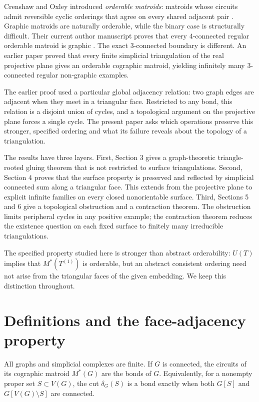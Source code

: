 \documentclass[11pt]{article}
\begin{document}
Crenshaw and Oxley introduced \emph{orderable matroids}: matroids whose circuits
admit reversible cyclic orderings that agree on every shared adjacent pair
\cite{crenshaw-oxley-published}. Graphic matroids are naturally orderable, while the binary case is
structurally difficult. Their current author manuscript proves that every
$4$-connected regular orderable matroid is graphic \cite[Theorem~1.5]{crenshaw-oxley-v12}. The exact
$3$-connected boundary is different. An earlier paper \cite{carptopus-rp2} proved that every
finite simplicial triangulation of the real projective plane gives an
orderable cographic matroid, yielding infinitely many $3$-connected regular
non-graphic examples.

The earlier proof used a particular global adjacency relation: two graph
edges are adjacent when they meet in a triangular face. Restricted to any
bond, this relation is a disjoint union of cycles, and a topological argument
on the projective plane forces a single cycle. The present paper asks which
operations preserve this stronger, specified ordering and what its failure
reveals about the topology of a triangulation.

The results have three layers. First, Section 3 gives a graph-theoretic
triangle-rooted gluing theorem that is not restricted to surface
triangulations. Second, Section 4 proves that the surface property is preserved
and reflected by simplicial connected sum along a triangular face. This
extends \cite{carptopus-rp2} from the projective plane to explicit infinite families on every
closed nonorientable surface. Third, Sections 5 and 6 give a topological
obstruction and a contraction theorem. The obstruction limits peripheral
cycles in any positive example; the contraction theorem reduces the existence
question on each fixed surface to finitely many irreducible triangulations.

The specified property studied here is stronger than abstract orderability:
$U(T)$ implies that $M^*(T^{(1)})$ is orderable, but an abstract consistent
ordering need not arise from the triangular faces of the given embedding. We
keep this distinction throughout.

\section{Definitions and the face-adjacency property}


All graphs and simplicial complexes are finite. If $G$ is connected, the
circuits of its cographic matroid $M^*(G)$ are the bonds of $G$. Equivalently,
for a nonempty proper set $S\subset V(G)$, the cut $\delta_G(S)$ is a bond
exactly when both $G[S]$ and $G[V(G)\setminus S]$ are connected.
\end{document}
